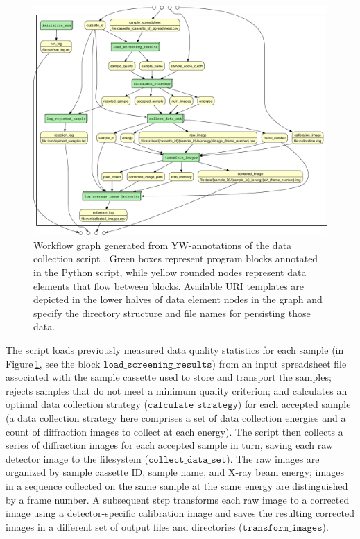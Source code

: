 \documentclass[letterpaper,twocolumn,10pt]{article}
\newcommand{\Figref}[1]{Figure\,\ref{#1}}
\newcommand{\code}[1]{\ensuremath{\mathtt{#1}}}
\newcommand{\yw}{\textsf{YW}}
\begin{document}
\begin{figure}[th]
  \centering
  \includegraphics[width=.8\textwidth]{combined-crop.pdf}
  \caption{\small Workflow graph generated from \yw-annotations of the
    data collection script \cite{mcphillips2015example}.  Green boxes
    represent program blocks annotated in the Python script, while
    yellow rounded nodes represent data elements that flow between
    blocks.  Available URI templates are 
    depicted in the lower halves of data element nodes in
    the graph and specify the directory structure and file names for
    persisting those data. }
  \label{fig-wfgraph}
\end{figure}


The script loads previously measured data quality statistics for each
sample (in \Figref{fig-wfgraph}, see the block
\code{load\_screening\_results}) from an input spreadsheet file
associated with the sample cassette used to store and transport the
samples; rejects samples that do not meet a minimum quality criterion;
and calculates an optimal data collection strategy
(\code{calculate\_strategy}) for each accepted sample (a data
collection strategy here comprises a set of data collection energies
and a count of diffraction images to collect at each energy). The
script then collects a series of diffraction images for each accepted
sample in turn, saving each raw detector image to the filesystem
(\code{collect\_data\_set}). The raw images are organized by sample
cassette ID, sample name, and X-ray beam energy; images in a sequence
collected on the same sample at the same energy are distinguished by a
frame number. A subsequent step transforms each raw image to a
corrected image using a detector-specific calibration image and saves
the resulting corrected images in a different set of output files and
directories (\code{transform\_images}).
\end{document}
